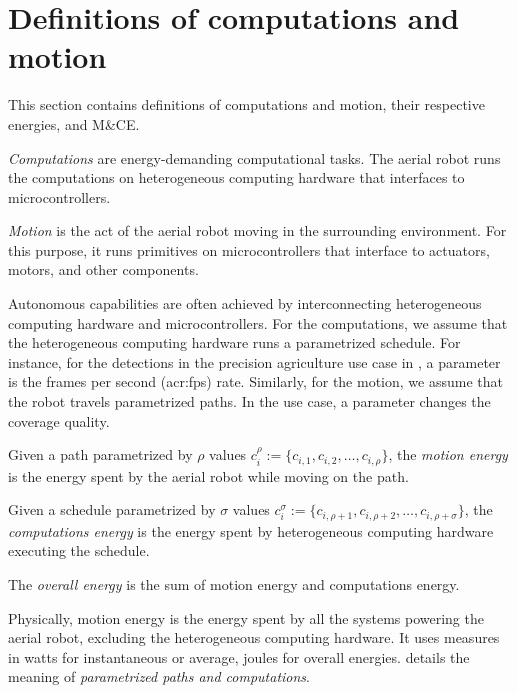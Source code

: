 \section{Definitions of computations and motion}
\label{sec:definitions}

This section contains definitions of computations and motion, their respective energies, and M\&CE.

\begin{defn}
  \label{def:comps}
  \emph{Computations} are energy-demanding computational tasks. The aerial robot runs the computations on heterogeneous computing hardware that interfaces to microcontrollers.
  
  \emph{Motion} is the act of the aerial robot moving in the surrounding environment. For this purpose, it runs primitives on microcontrollers that interface to actuators, motors, and other components.
\end{defn}

Autonomous capabilities are often achieved by interconnecting heterogeneous computing hardware and microcontrollers. For the computations, we assume that the heterogeneous computing hardware runs a parametrized schedule. For instance, for the detections in the precision agriculture use case in , a parameter is the frames per second (\Gls{acr:fps}) rate. Similarly, for the motion, we assume that the robot travels parametrized paths. In the use case, a parameter changes the coverage quality.

\begin{defn}
  \label{def:comp-mot-energy}
  Given a path parametrized by $\rho$ values $c_i^\rho:=\{c_{i,1},c_{i,2},\dots,c_{i,\rho}\}$, the \emph{motion energy} is the energy spent by the aerial robot while moving on the path.

  Given a schedule parametrized by $\sigma$ values $c_i^\sigma:=\{c_{i,\rho+1},c_{i,\rho+2},\dots,c_{i,\rho+\sigma}\}$, the \emph{computations energy} is the energy spent by heterogeneous computing hardware executing the schedule.
  
  The \emph{overall energy} is the sum of motion energy and computations energy.
\end{defn}

Physically, motion energy is the energy spent by all the systems powering the aerial robot, excluding the heterogeneous computing hardware. It uses measures in watts for instantaneous or average, joules for overall energies.  details the meaning of {\itshape parametrized paths and computations}.



